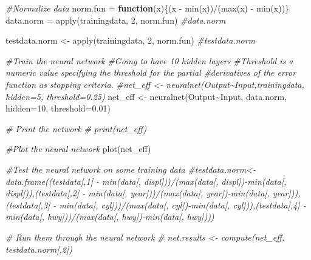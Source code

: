 \documentclass[
]{book}
\newenvironment{Shaded}{\begin{snugshade}}{\end{snugshade}}
\newcommand{\AttributeTok}[1]{\textcolor[rgb]{0.77,0.63,0.00}{#1}}
\newcommand{\CommentTok}[1]{\textcolor[rgb]{0.56,0.35,0.01}{\textit{#1}}}
\newcommand{\ControlFlowTok}[1]{\textcolor[rgb]{0.13,0.29,0.53}{\textbf{#1}}}
\newcommand{\DecValTok}[1]{\textcolor[rgb]{0.00,0.00,0.81}{#1}}
\newcommand{\FloatTok}[1]{\textcolor[rgb]{0.00,0.00,0.81}{#1}}
\newcommand{\FunctionTok}[1]{\textcolor[rgb]{0.00,0.00,0.00}{#1}}
\newcommand{\NormalTok}[1]{#1}
\newcommand{\OtherTok}[1]{\textcolor[rgb]{0.56,0.35,0.01}{#1}}
\newcommand{\SpecialCharTok}[1]{\textcolor[rgb]{0.00,0.00,0.00}{#1}}
\begin{document}
\begin{Shaded}
\begin{Highlighting}[]
\CommentTok{\#Normalize data}
\NormalTok{norm.fun }\OtherTok{=} \ControlFlowTok{function}\NormalTok{(x)\{(x }\SpecialCharTok{{-}} \FunctionTok{min}\NormalTok{(x))}\SpecialCharTok{/}\NormalTok{(}\FunctionTok{max}\NormalTok{(x) }\SpecialCharTok{{-}} \FunctionTok{min}\NormalTok{(x))\}}
\NormalTok{data.norm }\OtherTok{=} \FunctionTok{apply}\NormalTok{(trainingdata, }\DecValTok{2}\NormalTok{, norm.fun)}
\CommentTok{\#data.norm}

\NormalTok{testdata.norm }\OtherTok{\textless{}{-}} \FunctionTok{apply}\NormalTok{(trainingdata, }\DecValTok{2}\NormalTok{, norm.fun)}
\CommentTok{\#testdata.norm}


\CommentTok{\#Train the neural network}
\CommentTok{\#Going to have 10 hidden layers}
\CommentTok{\#Threshold is a numeric value specifying the threshold for the partial}
\CommentTok{\#derivatives of the error function as stopping criteria.}
\CommentTok{\#net\_eff \textless{}{-} neuralnet(Output\textasciitilde{}Input,trainingdata, hidden=5, threshold=0.25)}
\NormalTok{net\_eff }\OtherTok{\textless{}{-}} \FunctionTok{neuralnet}\NormalTok{(Output}\SpecialCharTok{\textasciitilde{}}\NormalTok{Input, data.norm, }\AttributeTok{hidden=}\DecValTok{10}\NormalTok{, }\AttributeTok{threshold=}\FloatTok{0.01}\NormalTok{)}

\CommentTok{\# Print the network}
\CommentTok{\# print(net\_eff)}

\CommentTok{\#Plot the neural network}
\FunctionTok{plot}\NormalTok{(net\_eff)}

\CommentTok{\#Test the neural network on some training data}
\CommentTok{\#testdata.norm\textless{}{-}data.frame((testdata[,1] {-} min(data[, \textquotesingle{}displ\textquotesingle{}]))/(max(data[, \textquotesingle{}displ\textquotesingle{}]){-}min(data[, \textquotesingle{}displ\textquotesingle{}])),(testdata[,2] {-} min(data[, \textquotesingle{}year\textquotesingle{}]))/(max(data[, \textquotesingle{}year\textquotesingle{}]){-}min(data[, \textquotesingle{}year\textquotesingle{}])),(testdata[,3] {-} min(data[, \textquotesingle{}cyl\textquotesingle{}]))/(max(data[, \textquotesingle{}cyl\textquotesingle{}]){-}min(data[, \textquotesingle{}cyl\textquotesingle{}])),(testdata[,4] {-} min(data[, \textquotesingle{}hwy\textquotesingle{}]))/(max(data[, \textquotesingle{}hwy\textquotesingle{}]){-}min(data[, \textquotesingle{}hwy\textquotesingle{}])))}

\CommentTok{\# Run them through the neural network}
\CommentTok{\# net.results \textless{}{-} compute(net\_eff, testdata.norm[,2]) }



\end{Highlighting}
\end{Shaded}
\end{document}
